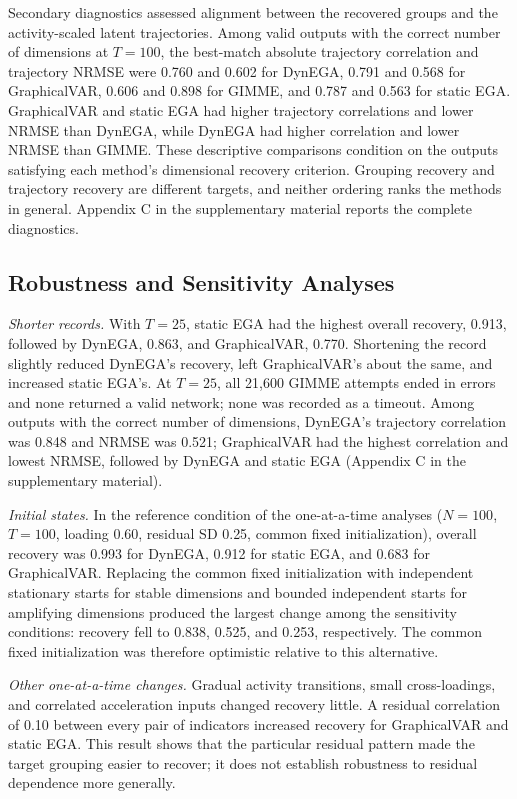 \documentclass[
]{article}
\begin{document}
Secondary diagnostics assessed alignment between the recovered groups
and the activity-scaled latent trajectories. Among valid outputs with
the correct number of dimensions at \(T=100\), the best-match absolute
trajectory correlation and trajectory NRMSE were 0.760 and 0.602 for
DynEGA, 0.791 and 0.568 for GraphicalVAR, 0.606 and 0.898 for GIMME, and
0.787 and 0.563 for static EGA. GraphicalVAR and static EGA had higher
trajectory correlations and lower NRMSE than DynEGA, while DynEGA had
higher correlation and lower NRMSE than GIMME. These descriptive
comparisons condition on the outputs satisfying each method's
dimensional recovery criterion. Grouping recovery and trajectory
recovery are different targets, and neither ordering ranks the methods
in general. Appendix C in the supplementary material reports the
complete diagnostics.

\subsection{Robustness and Sensitivity
Analyses}\label{robustness-and-sensitivity-analyses}

\emph{Shorter records.} With \(T=25\), static EGA had the highest
overall recovery, 0.913, followed by DynEGA, 0.863, and GraphicalVAR,
0.770. Shortening the record slightly reduced DynEGA's recovery, left
GraphicalVAR's about the same, and increased static EGA's. At \(T=25\),
all 21,600 GIMME attempts ended in errors and none returned a valid
network; none was recorded as a timeout. Among outputs with the correct
number of dimensions, DynEGA's trajectory correlation was 0.848 and
NRMSE was 0.521; GraphicalVAR had the highest correlation and lowest
NRMSE, followed by DynEGA and static EGA (Appendix C in the
supplementary material).

\emph{Initial states.} In the reference condition of the one-at-a-time
analyses (\(N=100\), \(T=100\), loading 0.60, residual SD 0.25, common
fixed initialization), overall recovery was 0.993 for DynEGA, 0.912 for
static EGA, and 0.683 for GraphicalVAR. Replacing the common fixed
initialization with independent stationary starts for stable dimensions
and bounded independent starts for amplifying dimensions produced the
largest change among the sensitivity conditions: recovery fell to 0.838,
0.525, and 0.253, respectively. The common fixed initialization was
therefore optimistic relative to this alternative.

\emph{Other one-at-a-time changes.} Gradual activity transitions, small
cross-loadings, and correlated acceleration inputs changed recovery
little. A residual correlation of 0.10 between every pair of indicators
increased recovery for GraphicalVAR and static EGA. This result shows
that the particular residual pattern made the target grouping easier to
recover; it does not establish robustness to residual dependence more
generally.
\end{document}
